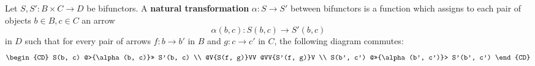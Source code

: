 Let $S, S': B \times C \to D$ be bifunctors. A \textbf{natural transformation} $\alpha: S \to S'$ between bifunctors is a function which assigns to each pair of objects $b \in B, c \in C$ an arrow
$$\alpha(b, c): S(b, c) \to S'(b, c)$$
in $D$ such that for every pair of arrows $f: b \to b'$ in $B$ and $g: c \to c'$ in $C$, the following diagram commutes:
$$\begin{CD}
S(b, c) @>{\alpha(b, c)}>> S'(b, c) \\
@V{S(f, g)}VV @VV{S'(f, g)}V \\
S(b', c') @>>{\alpha(b', c')}> S'(b', c')
\end{CD}$$
